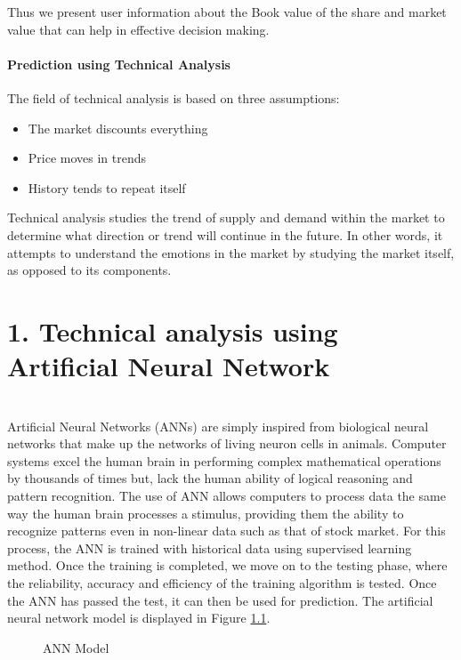 Thus we present user information about the Book value of the share and market value that can help in effective decision making.	

\subsubsection{Prediction using Technical Analysis }
\cite{nn} The field of technical analysis is based on three assumptions:
\begin{itemize}
	\item The market discounts everything
	\item Price moves in trends
	\item History tends to repeat itself
\end{itemize}

Technical analysis studies the trend of supply and demand within the market to determine what direction or trend will continue in the future. In other words, it attempts to understand the emotions in the market by studying the market itself, as opposed to its components.

\chapter{\textbf{1. Technical analysis using Artificial Neural Network  }}\\
Artificial Neural Networks (ANNs) are simply inspired from biological neural networks that make up the networks of living neuron cells in animals. Computer systems excel the human brain in performing complex mathematical operations by thousands of times but, lack the human ability of logical reasoning and pattern recognition. The use of ANN allows computers to process data the same way the human brain processes a stimulus, providing them the ability to recognize patterns even in non-linear data such as that of stock market. For this process, the ANN is trained with historical data using supervised learning method. Once the training is completed, we move on to the testing phase, where the reliability, accuracy and efficiency of the training algorithm is tested. Once the ANN has passed the test, it can then be used for prediction. 
The artificial neural network model is displayed in Figure \ref{fig:NN}.
\begin{figure}[h!]\centering
  \caption{ANN Model}
  \label{fig:NN}
\end{figure}

